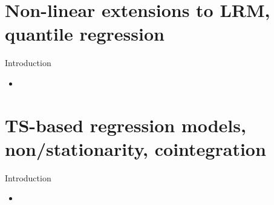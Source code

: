 \documentclass{beamer}
\begin{document}
\section{Non-linear extensions to LRM, quantile regression}

\begin{frame}{Introduction}

\begin{itemize}
  \item 
\end{itemize}

\end{frame}
\section{TS-based regression models, non/stationarity, cointegration}

\begin{frame}{Introduction}

\begin{itemize}
  \item 
\end{itemize}

\end{frame}
\end{document}
